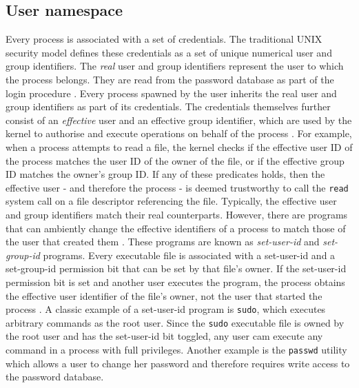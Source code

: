 \subsection{User namespace}
\label{sections:fundamentals/namespaces/user}
Every process is associated with a set of credentials. 
The traditional UNIX security model defines these credentials 
as a set of unique numerical user and group identifiers. The \textit{real} user and group identifiers 
represent the user to which the process belongs. They are read from the 
password database as part of the login procedure \cite{10.5555/1869911}. 
Every process spawned by the user inherits the real user and group identifiers as part of 
its credentials. 
The credentials themselves further consist of an \textit{effective} user and an effective group identifier,
which are used by the kernel to authorise and execute operations on behalf of the process \cite{10.5555/1869911}.
For example, when a process attempts to read a file, the kernel checks if the effective user ID
of the process matches the user ID of the owner of the file, or if the effective group ID matches the 
owner's group ID. If any of these predicates holds, then the effective user - and therefore the process - 
is deemed trustworthy to call the \verb|read| system call on a file descriptor referencing the file.
Typically, the effective user and group identifiers match their real counterparts. However, there 
are programs that can ambiently change the effective identifiers of a process to match 
those of the user that created them \cite{10.5555/1869911}. These programs are known as 
\textit{set-user-id} and \textit{set-group-id} programs. Every executable file is associated with 
a set-user-id and a set-group-id permission bit that can be set by that file's owner. 
If the set-user-id permission bit is set and another user executes the program, the process
obtains the effective user identifier of the file's owner, not the user that started the process \cite{10.5555/1869911}.
A classic example of a set-user-id program is \verb|sudo|, which executes arbitrary commands as the 
root user. Since the \verb|sudo| executable file is
owned by the root user and has the set-user-id bit toggled, any user cam execute any command 
in a process with full privileges. Another example is the \verb|passwd| utility which allows a user 
to change her password and therefore requires write access to the password database.  

